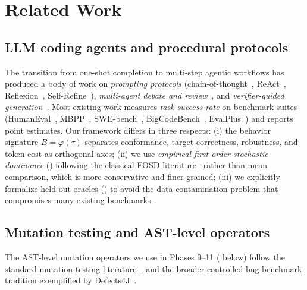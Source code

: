 \section{Related Work}
\label{sec:related-work}

\subsection{LLM coding agents and procedural protocols}

The transition from one-shot completion to multi-step agentic workflows has produced a body of work on \emph{prompting protocols} (chain-of-thought~\cite{wei2022chainofthought}, ReAct~\cite{yao2023react}, Reflexion~\cite{shinn2023reflexion}, Self-Refine~\cite{madaan2023selfrefine}), \emph{multi-agent debate and review}~\cite{wu2023autogen,du2023debate}, and \emph{verifier-guided generation}~\cite{xia2024agentless}. Most existing work measures \emph{task success rate} on benchmark suites (HumanEval~\cite{chen2021humaneval}, MBPP~\cite{austin2021mbpp}, SWE-bench~\cite{jimenez2024swebench}, BigCodeBench~\cite{zhuo2024bigcodebench}, EvalPlus~\cite{liu2024evalplus}) and reports point estimates. Our framework differs in three respects: (i) the behavior signature $B = \varphi(\tau)$ separates conformance, target-correctness, robustness, and token cost as orthogonal axes; (ii) we use \emph{empirical first-order stochastic dominance} () following the classical FOSD literature~\cite{hadar1969stochastic,levy1992stochastic} rather than mean comparison, which is more conservative and finer-grained; (iii) we explicitly formalize held-out oracles () to avoid the data-contamination problem that compromises many existing benchmarks~\cite{magar2022data,sainz2023nlp,zhou2023contamination}.

\subsection{Mutation testing and AST-level operators}

The AST-level mutation operators we use in Phases 9--11 ( below) follow the standard mutation-testing literature~\cite{demillo1978hints,offutt1996experimental,andrews2006mutation,jia2010survey}, and the broader controlled-bug benchmark tradition exemplified by Defects4J~\cite{just2014defects4j}.

